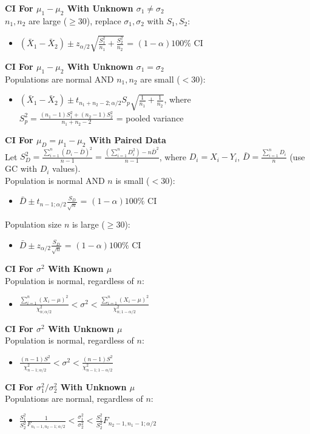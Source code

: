 \documentclass[a4paper, 12pt]{article}
\begin{document}
\begin{multicols*}{4}
\textbf{CI For $\mu_1-\mu_2$ With Unknown $\sigma_1 \neq \sigma_2$} \\
$n_1,n_2$ are large ($\geq 30$), replace $\sigma_1,\sigma_2$ with $S_1,S_2$:
\begin{itemize}
    \item $(\bar{X}_1 - \bar{X}_2) \pm z_{\alpha/2}\sqrt{\frac{S_1^2}{n_1}+\frac{S_2^2}{n_2}}$ = $(1-\alpha)100\%$ CI
\end{itemize}
\textbf{CI For $\mu_1-\mu_2$ With Unknown $\sigma_1 = \sigma_2$} \\
Populations are normal AND $n_1,n_2$ are small ($< 30$):
\begin{itemize}
    \item $(\bar{X}_1 - \bar{X}_2) \pm t_{n_1+n_2-2;\alpha/2}S_p\sqrt{\frac{1}{n_1}+\frac{1}{n_2}}$, where \\ $S_p^2=\frac{(n_1-1)S_1^2+(n_2-1)S_2^2}{n_1+n_2-2}$ = pooled variance
\end{itemize}
\textbf{CI For $\mu_D = \mu_1-\mu_2$ With Paired Data} \\
Let $S^2_D = \frac{\sum_{i=1}^n(D_i-\bar{D})^2}{n-1} = \frac{(\sum^n_{i=1}D_i^2)-n\bar{D}^2}{n-1}$, where $D_i = X_i - Y_i$, $\bar{D}=\frac{\sum_{i=1}^n D_i}{n}$ (use GC with $D_i$ values).\\
Population is normal AND $n$ is small ($< 30$):
\begin{itemize}
    \item $\bar{D}\pm t_{n-1;\alpha/2}\frac{S_D}{\sqrt{n}}$ = $(1-\alpha)100\%$ CI
\end{itemize}
Population size $n$ is large ($\geq 30$):
\begin{itemize}
    \item $\bar{D}\pm z_{\alpha/2}\frac{S_D}{\sqrt{n}}$ = $(1-\alpha)100\%$ CI
\end{itemize}
\textbf{CI For $\sigma^2$ With Known $\mu$} \\
Population is normal, regardless of $n$:
\begin{itemize}
    \item $\frac{\sum^n_{i=1}(X_i-\mu)^2}{\chi^2_{n;\alpha/2}} < \sigma^2 < \frac{\sum^n_{i=1}(X_i-\mu)^2}{\chi^2_{n;1-\alpha/2}}$
\end{itemize}
\textbf{CI For $\sigma^2$ With Unknown $\mu$} \\
Population is normal, regardless of $n$:
\begin{itemize}
    \item $\frac{(n-1)S^2}{\chi^2_{n-1;\alpha/2}} < \sigma^2 < \frac{(n-1)S^2}{\chi^2_{n-1;1-\alpha/2}}$
\end{itemize}
\textbf{CI For $\sigma^2_1/\sigma^2_2$ With Unknown $\mu$} \\
Populations are normal, regardless of $n$:
\begin{itemize}
    \item $\frac{S_1^2}{S_2^2}\frac{1}{F_{n_1-1,n_2-1;\alpha/2}} < \frac{\sigma_1^2}{\sigma_2^2} < \frac{S_1^2}{S_2^2}F_{n_2-1,n_1-1;\alpha/2}$
\end{itemize}


\end{multicols*}
\end{document}
